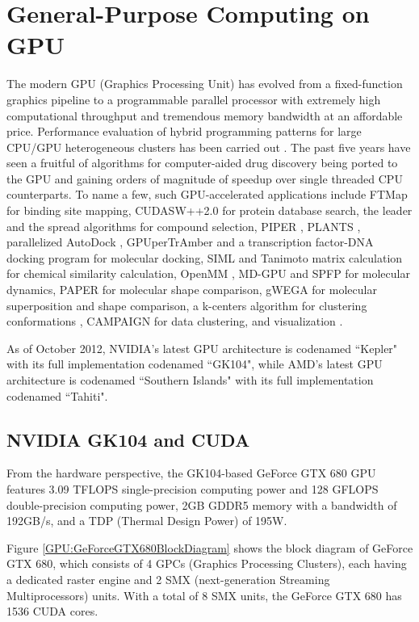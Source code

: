 \section{General-Purpose Computing on GPU}

The modern GPU (Graphics Processing Unit) has evolved from a fixed-function graphics pipeline to a programmable parallel processor with extremely high computational throughput and tremendous memory bandwidth at an affordable price. Performance evaluation of hybrid programming patterns for large CPU/GPU heterogeneous clusters has been carried out \citep{1035}. The past five years have seen a fruitful of algorithms for computer-aided drug discovery being ported to the GPU and gaining orders of magnitude of speedup over single threaded CPU counterparts. To name a few, such GPU-accelerated applications include FTMap \citep{722} for binding site mapping, CUDASW++2.0 \citep{189} for protein database search, the leader and the spread algorithms \citep{750} for compound selection, PIPER \citep{723}, PLANTS \citep{779}, parallelized AutoDock \citep{696}, GPUperTrAmber \citep{1270} and a transcription factor-DNA docking program \citep{1267,1266} for molecular docking, SIML \citep{726} and Tanimoto matrix calculation \citep{881} for chemical similarity calculation, OpenMM \citep{373}, MD-GPU \citep{374} and SPFP \citep{1261} for molecular dynamics, PAPER \citep{491} for molecular shape comparison, gWEGA \citep{1388} for molecular superposition and shape comparison, a k-centers algorithm for clustering conformations \citep{1275}, CAMPAIGN \citep{932} for data clustering, and visualization \citep{986}.

As of October 2012, NVIDIA’s latest GPU architecture is codenamed ``Kepler" with its full implementation codenamed ``GK104", while AMD's latest GPU architecture is codenamed ``Southern Islands" with its full implementation codenamed ``Tahiti".

\subsection{NVIDIA GK104 and CUDA}

From the hardware perspective, the GK104-based GeForce GTX 680 GPU features 3.09 TFLOPS single-precision computing power and 128 GFLOPS double-precision computing power, 2GB GDDR5 memory with a bandwidth of 192GB/s, and a TDP (Thermal Design Power) of 195W.

Figure \ref{GPU:GeForceGTX680BlockDiagram} shows the block diagram of GeForce GTX 680, which consists of 4 GPCs (Graphics Processing Clusters), each having a dedicated raster engine and 2 SMX (next-generation Streaming Multiprocessors) units. With a total of 8 SMX units, the GeForce GTX 680 has 1536 CUDA cores.

